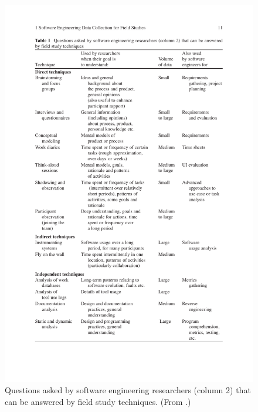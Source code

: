 \begin{figure}[p!]
\centering
\caption[Review of field study techniques]{Questions asked by software engineering researchers (column 2) that can be answered by field study techniques. (From \citep{Singer:2007tu}.)}
\label{fig:research-methodology:review:field-techniques}
\includegraphics[width=0.95\linewidth]{mainmatter/research-methodology/figures/field-techniques}
\end{figure}